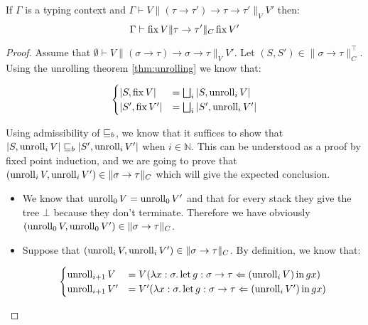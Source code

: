 \begin{lemma}
    If $\Gamma$ is a typing context and $\Gamma \vdash V \| (\tau \to \tau') \to
\tau \to \tau' \|_V V'$ then:
    \begin{equation*}
        \Gamma \vdash \Fix V \| \tau \to \tau' \|_C \Fix V'
    \end{equation*}
\end{lemma}
\begin{proof}
Assume that $\emptyset \vdash V \| (\sigma \to \tau) \to \sigma \to
\tau \|_V V'$. Let $(S,S') \in \| \sigma \to \tau\|_C^\top$.
Using the unrolling theorem \ref{thm:unrolling} we know that:

\begin{equation*}
    \begin{cases}
        |S, \Fix V| &= \bigsqcup_i | S, \Unroll_i V |     \\
        |S', \Fix V'| &= \bigsqcup_i | S', \Unroll_i V' |
    \end{cases}
\end{equation*}

Using admissibility of $\sqeq_b$, we know that it suffices 
to show that $|S, \Unroll_i V| \sqeq_b |S', \Unroll_i V'|$
when $i \in \mathbb{N}$. This can be 
understood as a proof by fixed point induction, and we are 
going to prove that $(\Unroll_i V, \Unroll_i V') \in \| \sigma \to \tau \|_C$
which will give the expected conclusion.

\begin{itemize}
    \item We know that $\Unroll_0 V = \Unroll_0 V'$ and 
        that for every stack they give the tree $\bot$ 
        because they don't terminate. Therefore 
        we have obviously $(\Unroll_0 V, \Unroll_0 V') \in \|
        \sigma \to \tau \|_C$.

    \item Suppose that $(\Unroll_i V, \Unroll_i V') \in \| \sigma
        \to \tau \|_C$. By definition, we know that:

        \begin{equation*}
            \begin{cases}
                \Unroll_{i+1} V &= V (\lambda x:\sigma.
                        \Bind{(\Unroll_i V)}{g : \sigma \to \tau}{g
                    x}) \\
                \Unroll_{i+1} V' &= V' (\lambda x:\sigma.
                        \Bind{(\Unroll_i V')}{g : \sigma \to \tau}{g
                    x}) \\
            \end{cases}
        \end{equation*}


\end{itemize}
\end{proof}

